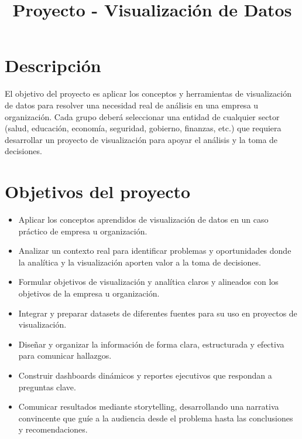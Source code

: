 \documentclass[12pt, spanish]{article}
\title{Proyecto - Visualización de Datos}
\date{}
\begin{document}
\maketitle

\section*{Descripción}
El objetivo del proyecto es aplicar los conceptos y herramientas de visualización de datos para resolver una necesidad real de análisis en una empresa u organización. Cada grupo deberá seleccionar una entidad de cualquier sector (salud, educación, economía, seguridad, gobierno, finanzas, etc.) que requiera desarrollar un proyecto de visualización para apoyar el análisis y la toma de decisiones.

\section*{Objetivos del proyecto}
\begin{itemize}
    \item Aplicar los conceptos aprendidos de visualización de datos en un caso práctico de empresa u organización.
    \item Analizar un contexto real para identificar problemas y oportunidades donde la analítica y la visualización aporten valor a la toma de decisiones.
    \item Formular objetivos de visualización y analítica claros y alineados con los objetivos de la empresa u organización.
    \item Integrar y preparar datasets de diferentes fuentes para su uso en proyectos de visualización.
    \item Diseñar y organizar la información de forma clara, estructurada y efectiva para comunicar hallazgos.
    \item Construir dashboards dinámicos y reportes ejecutivos que respondan a preguntas clave.
    \item Comunicar resultados mediante storytelling, desarrollando una narrativa convincente que guíe a la audiencia desde el problema hasta las conclusiones y recomendaciones.
\end{itemize}
\end{document}
